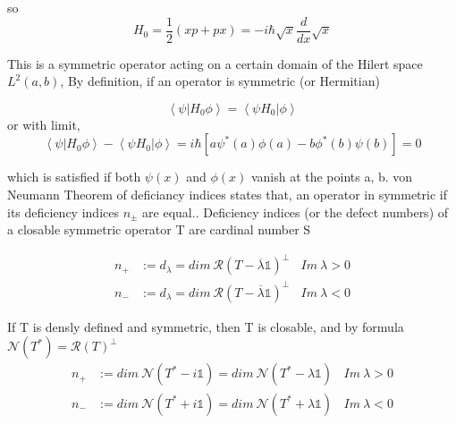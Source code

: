 \documentclass[12pt]{report}
\newcommand*{\1}{\hspace{1pt}}
\begin{document}
        so 
        \begin{equation}
            H_{0} = \frac{1}{2}\left(xp + px\right) = -i\hbar\sqrt{x}\frac{d}{dx}\sqrt{x}
        \end{equation}
        

        This is a symmetric operator acting on a certain domain of the Hilert space $L^{2}(a,b)$, By definition, if an operator is symmetric (or Hermitian)\cite{s5}

        \begin{equation}
            \left\langle\psi | H_{0}\phi \right\rangle = \left\langle\psi H_{0} |\phi \right\rangle
        \end{equation}
         or with limit,
        \begin{equation}
            \left\langle\psi | H_{0}\phi \right\rangle - \left\langle\psi H_{0} |\phi \right\rangle = i \hbar \left[a\psi ^{*}(a)\phi(a) - b\phi ^{*}(b)\psi(b)\right] = 0
        \end{equation}
        
        which is satisfied if both $\psi (x)$ and $\phi (x)$ vanish at the points a, b. von Neumann Theorem of deficiancy indices states that, an operator in symmetric if its deficiency
        indices $n_{\pm }$ are equal.\cite{s6}. Deficiency indices (or the defect numbers) of a closable symmetric operator T are cardinal number S

        \begin{equation}
            \begin{split}
                n_{+} &:= d_{\lambda}  = dim \ \mathcal{R} (T-\overline{\lambda}\mathds{1})^{\perp }  \ \ \ \    Im \ \lambda > 0 \\
                n_{-} &:= d_{\lambda}  = dim \ \mathcal{R} (T-\overline{\lambda}\mathds{1})^{\perp }  \ \ \ \    Im \ \lambda < 0 
            \end{split}
        \end{equation}

        If T is densly defined and symmetric, then T is closable, and by formula $\mathcal{N}(T^{*}) = \mathcal{R}(T)^{\perp}$
        \begin{equation}
            \begin{split}
                n_{+} &:= dim \ \mathcal{N} (T^{*}-i\mathds{1})  = dim \ \mathcal{N} (T^{*}-\lambda \mathds{1})  \ \ \ \    Im \ \lambda > 0 \\
                n_{-} &:= dim \ \mathcal{N} (T^{*}+i\mathds{1})  = dim \ \mathcal{N} (T^{*}+\lambda \mathds{1})  \ \ \ \    Im \ \lambda < 0 
            \end{split}
        \end{equation}
\end{document}
